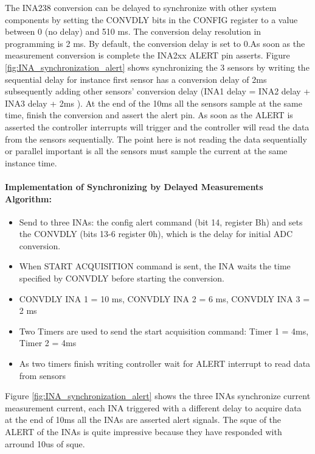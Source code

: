 The INA238 conversion can be delayed to synchronize with other system components by setting the CONVDLY bits in the CONFIG register to a value between 0 (no delay) and 510 ms. The conversion delay resolution in programming is 2 ms. By default, the conversion delay is set to 0.As soon as the measurement conversion is complete the INA2xx ALERT pin asserts. Figure \ref{fig:INA_synchronization_alert} shows synchronizing the 3 sensors by writing the sequential delay for instance first sensor has a conversion delay of 2ms subsequently adding other sensors' conversion delay (INA1 delay = INA2 delay + INA3 delay + 2ms ). At the end of the 10ms all the sensors sample at the same time, finish the conversion and assert the alert pin.  As soon as the ALERT is asserted the controller interrupts will trigger and the controller will read the data from the sensors sequentially. The point here is not reading the data sequentially or parallel important is all the sensors must sample the current at the same instance time.

\paragraph{Implementation of Synchronizing by Delayed Measurements Algorithm:}\label{sec:INA2XX_synch_delayed_method}
\begin{itemize}
    \item Send to three INAs: the config alert command (bit 14, register Bh) and sets the CONVDLY (bits 13-6 register 0h), which is the delay for initial ADC conversion. ​
    \item When START ACQUISITION command is sent, the INA waits the time specified by CONVDLY ​before starting the conversion.​
    \item CONVDLY INA 1 = 10 ms, ​CONVDLY INA 2 = 6 ms, ​CONVDLY INA 3 = 2 ms​
    \item Two Timers are used to send the start acquisition command: Timer 1 = 4ms, Timer 2 = 4ms​
    \item As two timers finish writing controller wait for ALERT interrupt to read data from sensors
\end{itemize}

Figure \ref{fig:INA_synchronization_alert} shows the three INAs synchronize current measurement current, each INA triggered with a different delay to acquire data at the end of 10ms all the INAs are asserted alert signals. The sque of the ALERT of the INAs is quite impressive because they have responded with arround 10us of sque.

